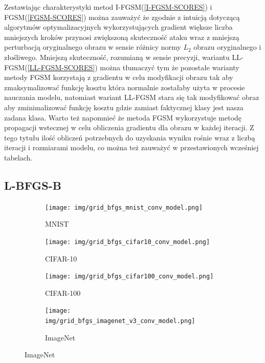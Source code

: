 \documentclass[
    left=2.5cm,         %
    right=2.5cm,        %
    top=2.5cm,          %
    bottom=3cm,         %
    bindingoffset=6mm,  %
    nohyphenation=false %
]{eiti/eiti-thesis}
\begin{document}
Zestawiając charakterystyki metod I-FGSM(\ref{I-FGSM-SCORES}) i FGSM(\ref{FGSM-SCORES}) można zauważyć że zgodnie z intuicją dotyczącą
algorytmów optymalizacyjnych wykorzystujących gradient większe liczba mniejszych kroków przynosi zwiększoną skuteczność ataku wraz
z mniejszą perturbacją oryginalnego obrazu w sensie różnicy normy \(L_2\) obrazu oryginalnego i złośliwego.
Mniejszą skuteczność, rozumianą w sensie precyzji, wariantu LL-FGSM(\ref{LL-FGSM-SCORES}) można tłumaczyć tym że pozostałe warianty
metody FGSM korzystają z gradientu w celu modyfikacji obrazu tak aby zmaksymalizować funkcję kosztu która normalnie zostałaby użyta w procesie nauczania modelu,
natomiast wariant LL-FGSM stara się tak modyfikować obraz aby zminimalizować funkcję kosztu gdzie zamiast faktycznej klasy jest nasza zadana klasa.
Warto też napomnieć że metoda FGSM wykorzystuje metodę propagacji wstecznej w celu obliczenia gradientu dla obrazu w każdej iteracji.
Z tego tytułu ilość obliczeń potrzebnych do uzyskania wyniku rośnie wraz z liczbą iteracji i rozmiarami modelu, co można też zauważyć w przestawionych wcześniej
tabelach.


\subsection{L-BFGS-B}
\lipsum[1]

\begin{figure}[H]
    \caption{Przykłady wygenerowanych złośliwych przykładów z zadaną klasą za pomocą metody L-BFGS-B}

    \begin{subfigure}[t]{0.48\textwidth}
        \texttt{[image: img/grid\_bfgs\_mnist\_conv\_model.png]}
        \caption{MNIST}
        \label{fig:mnist_grid_bfgs}
    \end{subfigure}%
    \hfill
    \begin{subfigure}[t]{0.48\textwidth}
        \texttt{[image: img/grid\_bfgs\_cifar10\_conv\_model.png]}
        \caption{CIFAR-10}
        \label{fig:cifar10_grid_bfgs}
    \end{subfigure}%

    \begin{subfigure}[t]{0.48\textwidth}
        \texttt{[image: img/grid\_bfgs\_cifar100\_conv\_model.png]}
        \caption{CIFAR-100}
        \label{fig:cifar100_grid_bfgs}
    \end{subfigure}%
    \hfill
    \begin{subfigure}[t]{0.48\textwidth}
        \texttt{[image: img/grid\_bfgs\_imagenet\_v3\_conv\_model.png]}
        \caption{ImageNet}
        \label{fig:imagenet_grid_bfgs}
    \end{subfigure}%

\end{figure}
\end{document}

